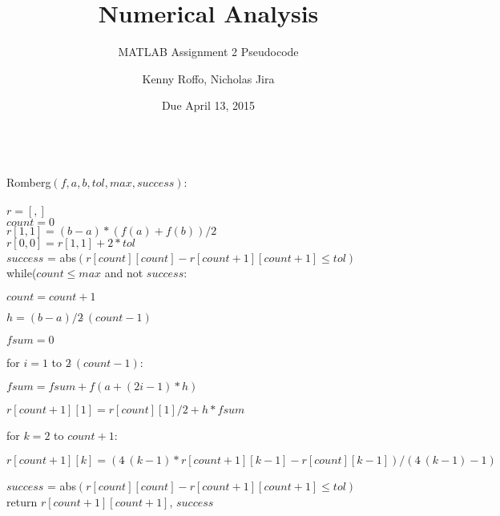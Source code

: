 \documentclass{scrartcl}
\title{Numerical Analysis}
\subtitle{MATLAB Assignment 2 Pseudocode}
\author{Kenny Roffo, Nicholas Jira}
\date{Due April 13, 2015}
\begin{document}
\maketitle
\ \\
Romberg$(f,a,b,tol,max,success)$:\\\\
$r=[,]$\\
$count=0$\\
$r[1,1]=(b-a)*(f(a)+f(b))/2$\\
$r[0,0]=r[1,1]+2*tol$\\
$success$ = abs$(r[count][count] - r[count+1][count+1] \le tol)$\\
while($count \le max$ and not $success$:

$count=count+1$

$h=(b-a)/2\hat \ (count-1)$

$fsum=0$

for $i=1$ to $2\hat \ (count-1)$:

\hspace{0.25 in}$fsum=fsum+f(a+(2i-1)*h)$

$r[count+1][1]=r[count][1]/2+h*fsum$

for $k=2$ to $count+1$:

\hspace{0.25 in}$r[count+1][k]=(4\hat \ (k-1)*r[count+1][k-1]-r[count][k-1])/(4\hat \ (k-1)-1)$

$success$ = abs$(r[count][count] - r[count+1][count+1] \le tol)$\\
return $r[count+1][count+1]$, $success$
\end{document}
